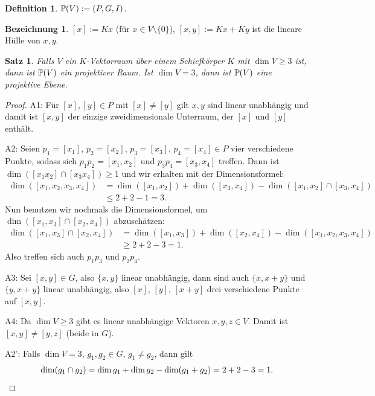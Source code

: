 \documentclass[
 a4paper,
 12pt,
 parskip=half
 ]{scrartcl}
\theoremstyle{plain}
\newtheorem{thm}{Satz}[section] %
\theoremstyle{definition}
\newtheorem*{defn*}{Definition}
\newtheorem*{deno*}{Bezeichnung}
\begin{document}
\begin{defn*}
 $\mathbb{P}(V) := (P,G,I)$.
\end{defn*}

\begin{deno*}
 $[x] := Kx$ (für $x \in V \setminus \{ 0 \}$), $[x,y] := Kx + Ky$ ist die lineare Hülle von $x,y$.
\end{deno*}

\begin{thm}
 Falls $V$ ein $K$-Vektorraum über einem Schiefkörper $K$ mit $\dim V \ge 3$ ist, dann ist $\mathbb{P}(V)$ ein projektiver Raum. Ist $\dim V = 3$, dann ist $\mathbb{P}(V)$ eine projektive Ebene.
\end{thm}

\begin{proof}
 A1: Für $[x], [y] \in P$ mit $[x] \ne [y]$ gilt $x,y$ sind linear unabhängig und damit ist $[x,y]$ der einzige zweidimensionale Unterraum, der $[x]$ und $[y]$ enthält.
 
 A2: Seien $p_1 = [x_1]$, $p_2 = [x_2]$, $p_3 = [x_3]$, $p_4 = [x_4] \in P$ vier verschiedene Punkte, sodass sich $p_1 p_2 = [x_1, x_2]$ und $p_3 p_4 = [x_3, x_4]$ treffen. Dann ist $\dim ( [x_1 x_2] \cap [x_3 x_4] ) \ge 1$ und wir erhalten mit der Dimensionsformel:
 \begin{align*}
  \dim( [x_1, x_2, x_3, x_4]) &= \dim( [x_1, x_2] ) + \dim( [x_3, x_4] ) - \dim( [x_1,x_2] \cap [x_3,x_4] ) \\
  &\le 2+2-1 = 3.
 \end{align*}
 Nun benutzen wir nochmals die Dimensionsformel, um $\dim( [x_1,x_3] \cap [x_2,x_4] )$ abzuschätzen:
 \begin{align*}
  \dim( [x_1,x_3] \cap [x_2,x_4] ) &= \dim( [x_1, x_3] ) + \dim( [x_2, x_4] ) - \dim( [x_1, x_2, x_3, x_4]) \\
  &\ge 2 + 2 - 3 = 1.
 \end{align*}
 Also treffen sich auch $p_1 p_3$ und $p_2 p_4$.
 
 A3: Sei $[x,y] \in G$, also $\{ x,y \}$ linear unabhängig, dann sind auch $\{ x, x+y \}$ und $\{ y, x+y \}$ linear unabhängig, also $[x]$, $[y]$, $[x+y]$ drei verschiedene Punkte auf $[x,y]$.
 
 A4: Da $\dim V \ge 3$ gibt es linear unabhängige Vektoren $x,y,z \in V$. Damit ist $[x,y] \ne [y,z]$ (beide in $G$).
 
 A2': Falls $\dim V = 3$, $g_1, g_2 \in G$, $g_1 \ne g_2$, dann gilt 
 \[ \dim( g_1 \cap g_2 ) = \dim g_1 + \dim g_2 - \dim( g_1 + g_2 ) = 2 + 2 - 3 = 1. \qedhere \]
\end{proof}
\end{document}
